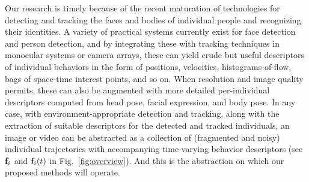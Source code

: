 Our research is timely because of the recent maturation of technologies for detecting and tracking the faces and bodies of individual people and recognizing their identities. A variety of practical systems currently exist for face detection and person detection, and by integrating these with tracking techniques in monocular systems or camera arrays, these can yield crude but useful descriptors of individual behaviors in the form of positions, velocities, histograms-of-flow, bags of space-time interest points, and so on. When resolution and image quality permits, these can also be augmented with more detailed per-individual descriptors computed from head pose, facial expression, and body pose. In any case, with environment-appropriate detection and tracking, along with the extraction of suitable descriptors for the detected and tracked individuals, an image or video can be abstracted as a collection of (fragmented and noisy) individual trajectories with accompanying time-varying behavior descriptors (see ${\bf f}_i$ and ${\bf f}_i(t)$ in Fig.~\ref{fig:overview}). And this is the abstraction on which our proposed methods will operate.

